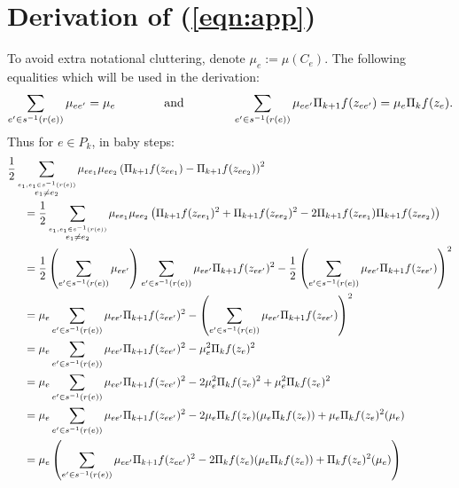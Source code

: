 \documentclass[12pt]{amsart}
\theoremstyle{plain}
\theoremstyle{definition}
\begin{document}
 \appendix
 \section{Derivation of (\ref{eqn:app})}
 \label{app:tedious}
 To avoid extra notational cluttering, denote $\mu_e:= \mu(C_{e})$. The following equalities which will be used in the derivation:
$$\sum_{e'\in s^{-1}(r(e))} \mu_{ee'}  = \mu_e \hspace{.5in} \mbox{ and } \hspace{.5in}\sum_{e'\in s^{-1} (r(e))}\mu_{ee'} \Pi_{k+1}f(z_{ee'})  =  \mu_e\Pi_kf(z_e).$$
Thus for $e\in P_k$, in baby steps:
\begin{align*}
    &\frac12 \sum_{\overset{e_1,e_1\in s^{-1}(r(e))}{e_1\neq e_2}}\mu_{ee_1}\mu_{ee_2}\left(\Pi_{k+1}f(z_{ee_1})- \Pi_{k+1}f(z_{ee_2})\right)^2 \\
    &\hspace{.2in} =\frac12 \sum_{\overset{e_1,e_1\in s^{-1}(r(e))}{e_1\neq e_2}}\mu_{ee_1}\mu_{ee_2}\left(\Pi_{k+1}f(z_{ee_1})^2+ \Pi_{k+1}f(z_{ee_2})^2 - 2 \Pi_{k+1}f(z_{ee_1})\Pi_{k+1}f(z_{ee_2})\right)  \\
    &\hspace{.2in} = \frac12 \left( \sum_{e'\in s^{-1}(r(e))} \mu_{ee'} \right) \sum_{e'\in s^{-1} (r(e))}\mu_{ee'} \Pi_{k+1}f(z_{ee'})^2 - \frac12 \left( \sum_{e'\in s^{-1} (r(e))}\mu_{ee'} \Pi_{k+1}f(z_{ee'}) \right)^2 \\
    &\hspace{.2in} = \mu_e \sum_{e'\in s^{-1} (r(e))}\mu_{ee'} \Pi_{k+1}f(z_{ee'})^2 - \left( \sum_{e'\in s^{-1} (r(e))}\mu_{ee'} \Pi_{k+1}f(z_{ee'}) \right)^2 \\
    &\hspace{.2in} = \mu_e \sum_{e'\in s^{-1} (r(e))}\mu_{ee'} \Pi_{k+1}f(z_{ee'})^2 - \mu_e^2\Pi_kf(z_e)^2 \\
    &\hspace{.2in} = \mu_e \sum_{e'\in s^{-1} (r(e))}\mu_{ee'} \Pi_{k+1}f(z_{ee'})^2 - 2\mu_e^2\Pi_kf(z_e)^2  + \mu_e^2\Pi_kf(z_e)^2 \\
    &\hspace{.2in} = \mu_e \sum_{e'\in s^{-1} (r(e))}\mu_{ee'} \Pi_{k+1}f(z_{ee'})^2 - 2\mu_e\Pi_kf(z_e)(\mu_e\Pi_kf(z_e))  + \mu_e\Pi_kf(z_e)^2 (\mu_e) \\
    &\hspace{.2in} = \mu_e \left(\sum_{e'\in s^{-1} (r(e))}\mu_{ee'} \Pi_{k+1}f(z_{ee'})^2 - 2\Pi_kf(z_e)(\mu_e\Pi_kf(z_e))  + \Pi_kf(z_e)^2 (\mu_e) \right) \\

\end{align*}
\end{document}
